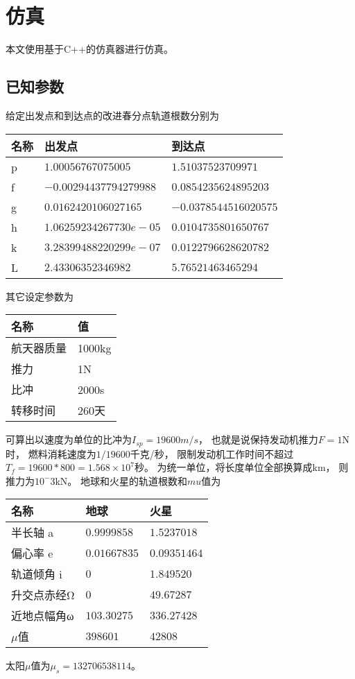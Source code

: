 \section{仿真}
本文使用基于C++的仿真器\cite{olzhn2021}进行仿真。

\subsection{已知参数}
给定出发点和到达点的改进春分点轨道根数分别为
\begin{center}\begin{tabular}{lll}
    \toprule
    名称 & 出发点 & 到达点 \\
    \midrule
    p & $1.00056767075005     $ & $1.51037523709971    $ \\
    f & $-0.00294437794279988 $ & $0.0854235624895203  $ \\
    g & $0.0162420106027165   $ & $-0.0378544516020575 $ \\
    h & $1.06259234267730e-05 $ & $0.0104735801650767  $ \\
    k & $3.28399488220299e-07 $ & $0.0122796628620782  $ \\
    L & $2.43306352346982     $ & $5.76521463465294    $ \\
    \bottomrule
\end{tabular}\end{center}
其它设定参数为
\begin{center}\begin{tabular}{ll}
    \toprule
    名称 & 值 \\
    \midrule
    航天器质量 & 1000kg \\
    推力 & 1N \\
    比冲 & 2000s \\
    转移时间 & 260天 \\
    \bottomrule
\end{tabular}\end{center}
可算出以速度为单位的比冲为$I_{sp}=19600m/s$，
也就是说保持发动机推力$F=1$N时，
燃料消耗速度为$1/19600$千克/秒，
限制发动机工作时间不超过$T_f=19600*800=1.568\times10^7$秒。
为统一单位，将长度单位全部换算成km，
则推力为$10^-3$kN。
地球和火星的轨道根数和$mu$值为\cite{mhongbo2015}
\begin{center}\begin{tabular}{lll}
    \toprule
    名称 & 地球 & 火星 \\
    \midrule
    半长轴    a & $0.9999858 $ & $1.5237018$\\
    偏心率    e & $0.01667835$ & $0.09351464$\\
    轨道倾角  i & $0         $ & $1.849520$\\
    升交点赤经Ω & $0         $ & $49.67287$\\
    近地点幅角ω & $103.30275 $ & $336.27428$\\
    $\mu$值    & $398601     $ & $42808$\\
    \bottomrule
\end{tabular}\end{center}
太阳$\mu$值为$\mu_s=132706538114$。

